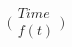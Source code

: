 \documentclass[preview]{standalone}
\begin{document}
\begin{align*}
\big(\begin{array}{c} Time \\ f(t) \end{array})
\end{align*}
\end{document}
